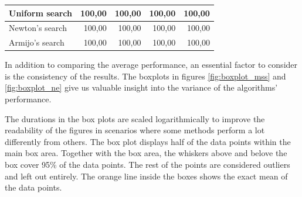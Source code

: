 \documentclass[english, 12pt, a4paper, sci, utf8, a-1b, online, table]{aaltothesis}
\begin{document}
\begin{table}[H]
\begin{tabular}{|l|r|r|r|r|}
    Uniform search                                                             & 100,00                                                   & 100,00                                                    & 100,00                                                    & 100,00                                                    \\ \hline
    Newton's search                                                             & 100,00                                                   & 100,00                                                    & 100,00                                                    & 100,00                                                    \\ \hline
    Armijo's search                                                              & 100,00                                                   & 100,00                                                    & 100,00                                                    & 100,00                                                    \\ \hline
    \end{tabular}
\end{table}


In addition to comparing the average performance, an essential factor to consider is the consistency of the results. The boxplots in figures \ref{fig:boxplot_mss} and \ref{fig:boxplot_ne} give us valuable insight into the variance of the algorithms' performance.

The durations in the box plots are scaled logarithmically to improve the readability of the figures in scenarios where some methods perform a lot differently from others. The box plot displays half of the data points within the main box area. Together with the box area, the whiskers above and belove the box cover 95\% of the data points. The rest of the points are considered outliers and left out entirely. The orange line inside the boxes shows the exact mean of the data points.
\end{document}
